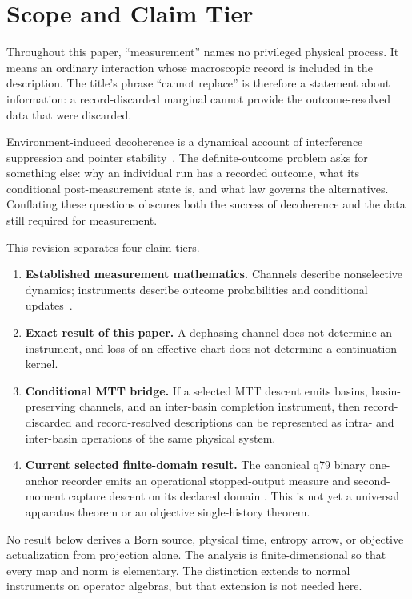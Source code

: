\documentclass[11pt]{article}
\begin{document}
\tableofcontents

\section{Scope and Claim Tier}

Throughout this paper, ``measurement'' names no privileged physical process.
It means an ordinary interaction whose macroscopic record is included in the
description.  The title's phrase ``cannot replace'' is therefore a statement
about information: a record-discarded marginal cannot provide the
outcome-resolved data that were discarded.

Environment-induced decoherence is a dynamical account of interference
suppression and pointer stability~\cite{Zurek2003,Schlosshauer2005}.  The
definite-outcome problem asks for something else: why an individual run has a
recorded outcome, what its conditional post-measurement state is, and what law
governs the alternatives.  Conflating these questions obscures both the
success of decoherence and the data still required for measurement.

This revision separates four claim tiers.
\begin{enumerate}[label=\arabic*.]
\item \textbf{Established measurement mathematics.}  Channels describe
nonselective dynamics; instruments describe outcome probabilities and
conditional updates~\cite{DaviesLewis1970}.
\item \textbf{Exact result of this paper.}  A dephasing channel does not
determine an instrument, and loss of an effective chart does not determine a
continuation kernel.
\item \textbf{Conditional MTT bridge.}  If a selected MTT descent emits
basins, basin-preserving channels, and an inter-basin completion instrument,
then record-discarded and record-resolved descriptions can be represented as
intra- and inter-basin operations of the same physical system.
\item \textbf{Current selected finite-domain result.}  The canonical q79
binary one-anchor recorder emits an operational stopped-output measure and
second-moment capture descent on its declared domain
\cite{NeroQ79Recorder}.  This is not yet a universal apparatus theorem or an
objective single-history theorem.
\end{enumerate}

No result below derives a Born source, physical time, entropy arrow, or
objective actualization from projection alone.  The analysis is
finite-dimensional so that every map and norm is elementary.  The distinction
extends to normal instruments on operator algebras, but that extension is not
needed here.
\end{document}
